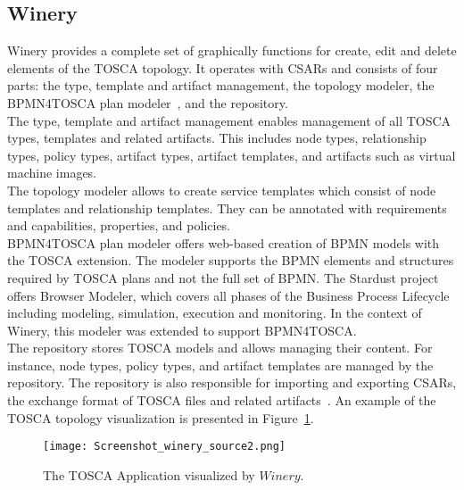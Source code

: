 \subsection*{Winery}\label{subs:wine}\label{tool:winery}
Winery provides a complete set of graphically functions for create, edit and delete elements of the TOSCA topology. 
It operates with CSARs and consists of four parts: the type, template and artifact management, the topology modeler, the BPMN4TOSCA plan modeler~\cite{BPMN4TOSCA}, and the repository.\\
The type, template and artifact management enables management of all TOSCA types, templates and related artifacts. 
This includes node types, relationship types, policy types, artifact types, artifact templates, and artifacts such as virtual machine images.\\
The topology modeler allows to create service templates which consist of node templates and relationship templates. 
They can be annotated with requirements and capabilities, properties, and policies.\\
BPMN4TOSCA plan modeler offers web-based creation of BPMN models with the TOSCA extension. 
The modeler supports the BPMN elements and structures required by TOSCA plans and not the full set of BPMN. 
The Stardust project~\cite*{stardust} offers Browser Modeler, which covers all phases of the Business Process Lifecycle including modeling, simulation, execution and monitoring. 
In the context of Winery, this modeler was extended to support BPMN4TOSCA.\\
The repository stores TOSCA models and allows managing their content. 
For instance, node types, policy types, and artifact templates are managed by the repository. 
The repository is also responsible for importing and exporting CSARs, the exchange format of TOSCA files and related artifacts~\cite{winery}. %
An example of the TOSCA topology visualization is presented in Figure~\ref{fig:winery_source}.
\begin{figure}[ht]   
\centering
\texttt{[image: Screenshot\_winery\_source2.png]}
\caption{The TOSCA Application visualized by $Winery$.}
\label{fig:winery_source}
\end{figure}
